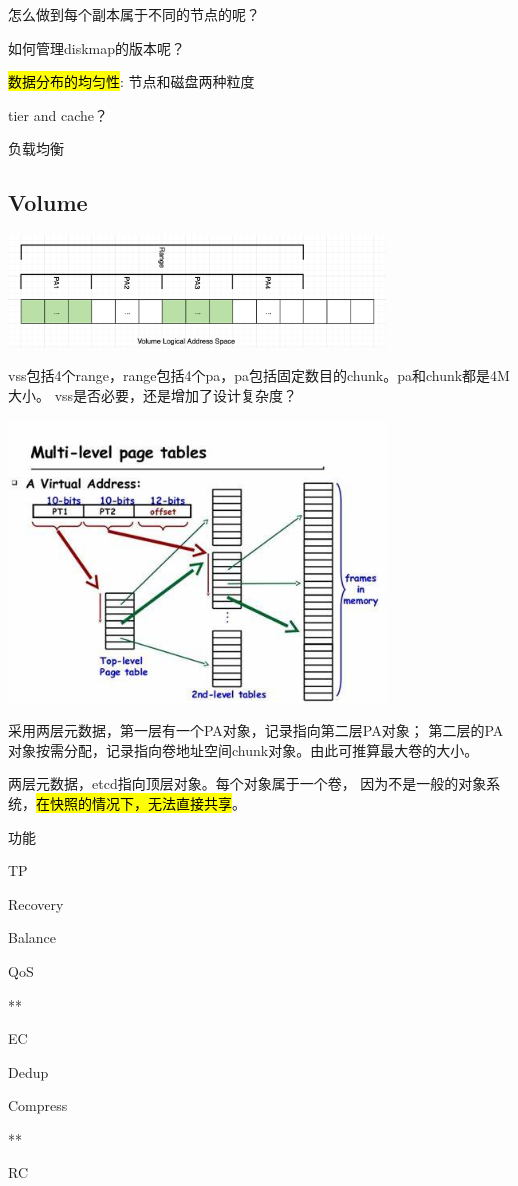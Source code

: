 怎么做到每个副本属于不同的节点的呢？

如何管理diskmap的版本呢？

\hl{数据分布的均匀性}: 节点和磁盘两种粒度

tier and cache？

负载均衡

\subsection{Volume}

\begin{center}
\includegraphics[width=10cm]{../imgs/volume-addressspace.png}
\end{center}

vss包括4个range，range包括4个pa，pa包括固定数目的chunk。pa和chunk都是4M大小。
vss是否必要，还是增加了设计复杂度？

\begin{center}
\includegraphics[width=10cm]{../imgs/oos/pagetable.jpeg}
\end{center}

采用两层元数据，第一层有一个PA对象，记录指向第二层PA对象；
第二层的PA对象按需分配，记录指向卷地址空间chunk对象。由此可推算最大卷的大小。

两层元数据，etcd指向顶层对象。每个对象属于一个卷，
因为不是一般的对象系统，\hl{在快照的情况下，无法直接共享}。

\hrulefill

功能
\begin{enumbox}
\item TP
\item Recovery
\item Balance
\item QoS
\item ***
\item EC
\item Dedup
\item Compress
\item ***
\item RC
\end{enumbox}

